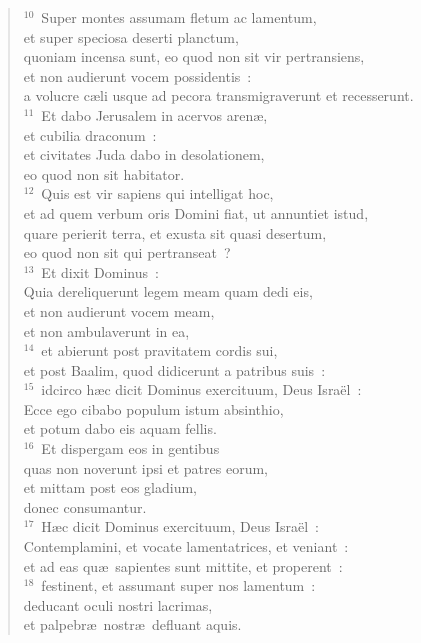 \begin{flushleft}
\begin{verse}
${}^{10}$~Super montes assumam fletum ac lamentum,\\ et super speciosa deserti planctum,\\ quoniam incensa sunt, eo quod non sit vir pertransiens,\\ et non audierunt vocem possidentis~:\\ a volucre c\ae li usque ad pecora transmigraverunt et recesserunt.\\
${}^{11}$~Et dabo Jerusalem in acervos aren\ae ,\\ et cubilia draconum~:\\ et civitates Juda dabo in desolationem,\\ eo quod non sit habitator.\\
${}^{12}$~Quis est vir sapiens qui intelligat hoc,\\ et ad quem verbum oris Domini fiat, ut annuntiet istud,\\ quare perierit terra, et exusta sit quasi desertum,\\ eo quod non sit qui pertranseat~?\\
${}^{13}$~Et dixit Dominus~:\\ Quia dereliquerunt legem meam quam dedi eis,\\ et non audierunt vocem meam,\\ et non ambulaverunt in ea,\\
${}^{14}$~et abierunt post pravitatem cordis sui,\\ et post Baalim, quod didicerunt a patribus suis~:\\
${}^{15}$~idcirco h\ae c dicit Dominus exercituum, Deus Isra\"el~:\\ Ecce ego cibabo populum istum absinthio,\\ et potum dabo eis aquam fellis.\\
${}^{16}$~Et dispergam eos in gentibus\\ quas non noverunt ipsi et patres eorum,\\ et mittam post eos gladium,\\ donec consumantur.\\
${}^{17}$~H\ae c dicit Dominus exercituum, Deus Isra\"el~:\\ Contemplamini, et vocate lamentatrices, et veniant~:\\ et ad eas qu\ae\ sapientes sunt mittite, et properent~:\\
${}^{18}$~festinent, et assumant super nos lamentum~:\\ deducant oculi nostri lacrimas,\\ et palpebr\ae\ nostr\ae\ defluant aquis.\\

\end{verse}
\end{flushleft}
